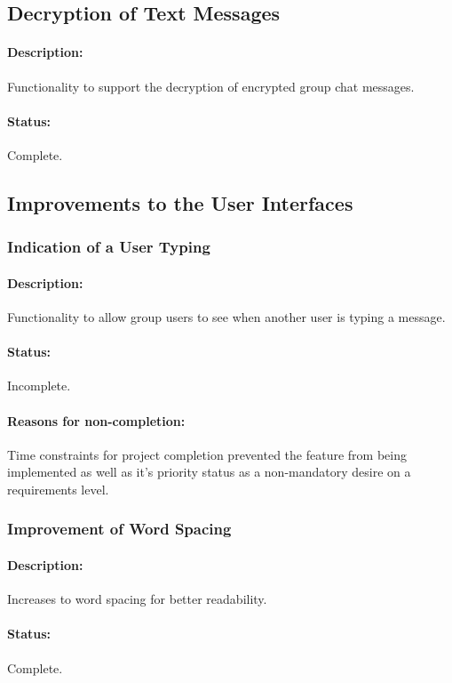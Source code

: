 \documentclass[11pt]{article}
\begin{document}
\subsection{Decryption of Text Messages}
\paragraph{Description:} Functionality to support the decryption of encrypted group chat messages.
\paragraph{Status:} Complete.

\subsection{Improvements to the User Interfaces}

\subsubsection{Indication of a User Typing}
\paragraph{Description:} Functionality to allow group users to see when another user is typing a message.
\paragraph{Status:} Incomplete.
\paragraph{Reasons for non-completion:} Time constraints for project completion prevented the feature from being implemented as well as it's priority status as a non-mandatory desire on a requirements level.

\subsubsection{Improvement of Word Spacing}
\paragraph{Description:} Increases to word spacing for better readability.
\paragraph{Status:} Complete.
\end{document}
